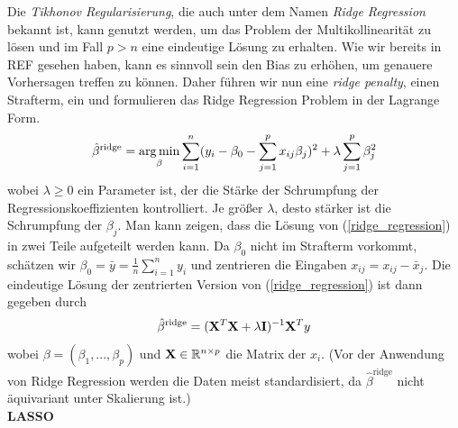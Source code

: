 Die \textit{Tikhonov Regularisierung}, die auch unter dem Namen \textit{Ridge Regression} bekannt ist, kann genutzt werden, um das Problem der Multikollinearität zu lösen und im Fall $p > n$ eine eindeutige Lösung zu erhalten.
Wie wir bereits in REF gesehen haben, kann es sinnvoll sein den Bias zu erhöhen, um genauere Vorhersagen treffen zu können. Daher führen wir nun eine \textit{ridge penalty}, einen Strafterm, ein und formulieren das Ridge Regression Problem in der Lagrange Form.
\begin{align}
\label{ridge_regression}
\hat{\beta}^{\text{ridge}} = \operatorname*{arg\,min}_{\beta} \sum_{i=1}^{n}(y_i - \beta_0 - \sum_{j=1}^p x_{ij}\beta_j)^2 + \lambda\sum_{j=1}^p \beta_j^2
\end{align}
wobei $\lambda \geq 0$ ein Parameter ist, der die Stärke der Schrumpfung der Regressionskoeffizienten kontrolliert. Je größer $\lambda$, desto stärker ist die Schrumpfung der $\beta_j$. Man kann zeigen, dass die Lösung von (\ref{ridge_regression}) in zwei Teile aufgeteilt werden kann. Da $\beta_0$ nicht im Strafterm vorkommt, schätzen wir $\beta_0 = \bar{y} = \frac{1}{n}\sum_{i=1}^{n} y_i$ und zentrieren die Eingaben $x_{ij} = x_{ij} - \bar{x}_j$. Die eindeutige Lösung der zentrierten Version von (\ref{ridge_regression}) ist dann gegeben durch
\begin{align}
\hat{\beta}^{\text{ridge}}  = (\mathbf{X}^T \mathbf{X} + \lambda\mathbf{I})^{-1}\mathbf{X}^Ty
\end{align}
wobei $\beta = (\beta_1, \ldots, \beta_p)$ und $\mathbf{X} \in \mathbb{R}^{n \times p}$ die Matrix der $x_i$. (Vor der Anwendung von Ridge Regression werden die Daten meist standardisiert, da $\hat{\beta}^{\text{ridge}}$ nicht äquivariant unter Skalierung ist.) \\


\textbf{LASSO}

